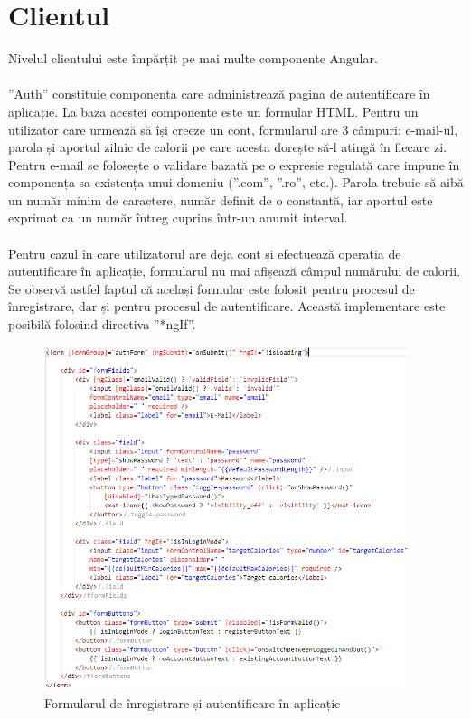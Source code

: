 \section{Clientul}
Nivelul clientului este împărțit pe mai multe componente Angular.
\\ \\
”Auth” constituie componenta care administrează pagina de autentificare în aplicație. La baza acestei componente este un formular HTML. Pentru un utilizator care urmează să își creeze un cont, formularul are 3 câmpuri: e-mail-ul, parola și aportul zilnic de calorii pe care acesta dorește să-l atingă în fiecare zi. Pentru e-mail se folosește o validare bazată pe o expresie regulată care impune în componența sa existența unui domeniu (”.com”, ”.ro”, etc.). Parola trebuie să aibă un număr minim de caractere, număr definit de o constantă, iar aportul este exprimat ca un număr întreg cuprins într-un anumit interval.
\\ \\
Pentru cazul în care utilizatorul are deja cont și efectuează operația de autentificare în aplicație, formularul nu mai afișează câmpul numărului de calorii.
Se observă astfel faptul că același formular este folosit pentru procesul de înregistrare, dar și pentru procesul de autentificare. Această implementare este posibilă folosind directiva ”*ngIf”.

\begin{figure}[!htb]
	\centering
	\includegraphics[width=0.95\textwidth]
	{../LaTeX/Images/implementare_form.PNG}
	\caption{Formularul de înregistrare și autentificare în aplicație}
	\label{fig:62}
\end{figure}


